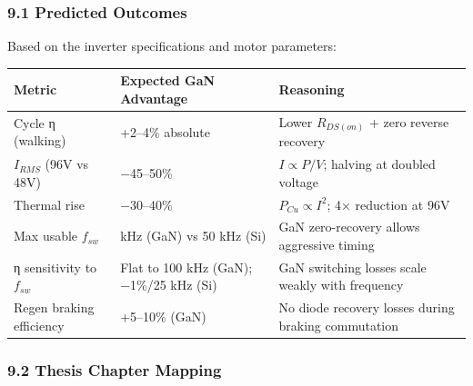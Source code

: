 \documentclass[
]{article}
\newcounter{none} %
\begin{document}
\subsubsection{9.1 Predicted Outcomes}\label{predicted-outcomes}

Based on the inverter specifications and motor parameters:

{\def\LTcaptype{none} %
\begin{longtable}[]{@{}
  >{\raggedright\arraybackslash}p{}
  >{\raggedright\arraybackslash}p{}
  >{\raggedright\arraybackslash}p{}@{}}
\toprule\noalign{}
\begin{minipage}[b]{\linewidth}\raggedright
Metric
\end{minipage} & \begin{minipage}[b]{\linewidth}\raggedright
Expected GaN Advantage
\end{minipage} & \begin{minipage}[b]{\linewidth}\raggedright
Reasoning
\end{minipage} \\
\midrule\noalign{}
\endhead
\bottomrule\noalign{}
\endlastfoot
Cycle η (walking) & +2--4\% absolute & Lower \(R_{DS(on)}\) + zero
reverse recovery \\
\(I_{RMS}\) (96V vs 48V) & −45--50\% & \(I \propto P/V\); halving at
doubled voltage \\
Thermal rise & −30--40\% & \(P_{Cu} \propto I^2\); 4× reduction at
96V \\
Max usable \(f_{sw}\) & 100 kHz (GaN) vs 50 kHz (Si) & GaN zero-recovery
allows aggressive timing \\
η sensitivity to \(f_{sw}\) & Flat to 100 kHz (GaN); −1\%/25 kHz (Si) &
GaN switching losses scale weakly with frequency \\
Regen braking efficiency & +5--10\% (GaN) & No diode recovery losses
during braking commutation \\
\end{longtable}
}

\subsubsection{9.2 Thesis Chapter Mapping}\label{thesis-chapter-mapping}
\end{document}
